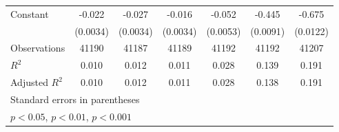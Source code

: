 {\begin{tabular}{l*{6}{c}}
Constant            &      -0.022\sym{***}&      -0.027\sym{***}&      -0.016\sym{***}&      -0.052\sym{***}&      -0.445\sym{***}&      -0.675\sym{***}\\
                    &    (0.0034)         &    (0.0034)         &    (0.0034)         &    (0.0053)         &    (0.0091)         &    (0.0122)         \\
\midrule
Observations        &       41190         &       41187         &       41189         &       41192         &       41192         &       41207         \\
\(R^{2}\)           &       0.010         &       0.012         &       0.011         &       0.028         &       0.139         &       0.191         \\
Adjusted \(R^{2}\)  &       0.010         &       0.012         &       0.011         &       0.028         &       0.138         &       0.191         \\
\bottomrule
\multicolumn{7}{l}{\footnotesize Standard errors in parentheses}\\
\multicolumn{7}{l}{\footnotesize \sym{*} \(p<0.05\), \sym{**} \(p<0.01\), \sym{***} \(p<0.001\)}\\
\end{tabular}
}
